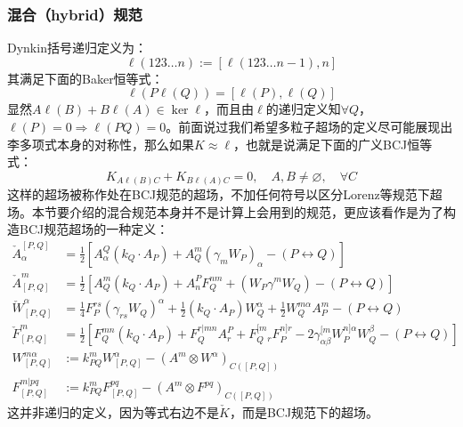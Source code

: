 \subsubsection{混合（hybrid）规范}
Dynkin括号递归定义为：
\begin{equation}
	\ell(123\ldots n):=[\ell(123\ldots n-1),n]
\end{equation}
其满足下面的Baker恒等式：
\begin{equation}
	\ell(P\ell(Q))=[\ell(P),\ell(Q)]
\end{equation}
显然$A\ell(B)+B\ell(A)\in\ker\ell$，而且由$\ell$的递归定义知$\forall Q$，$\ell(P) = 0\Rightarrow \ell(PQ)=0$。前面说过我们希望多粒子超场的定义尽可能展现出李多项式本身的对称性，那么如果$K\approx \ell$，也就是说满足下面的广义BCJ恒等式：
\begin{equation}
	K_{A\ell(B)C}+K_{B\ell(A)C}=0,\quad A,B\neq\varnothing,\quad\forall C
\end{equation}
这样的超场被称作处在BCJ规范的超场，不加任何符号以区分Lorenz等规范下超场。本节要介绍的混合规范本身并不是计算上会用到的规范，更应该看作是为了构造BCJ规范超场的一种定义：
\begin{equation}
	\begin{aligned}
		\check{A}_\alpha^{[P,  {Q}]}&=\frac{1}{2}[A_\alpha^  {Q}(k_Q\cdot A_P)+A_Q^m(\gamma_mW_P)_\alpha-(P\leftrightarrow Q)]
		\\\check{A}_{[P,  {Q}]}^m&=\frac{1}{2}[A_Q^m(k_Q\cdot A_P)+A_n^PF_Q^{nm}+(W_P\gamma^mW_Q)-(P\leftrightarrow Q)]\\
		\check{W}_{[P,  {Q}]}^\alpha&=\frac{1}{4}F_P^{rs}(\gamma_{rs}W_Q)^\alpha+\frac{1}{2}(k_Q\cdot A_P)W_Q^\alpha+\frac{1}{2}W_Q^{m\alpha}A_P^m-(P\leftrightarrow Q)\\
		\check{F}_{[P,  {Q}]}^m&=\frac{1}{2}{\left[F_Q^{mn}(k_Q\cdot A_P)+F_Q^{r|mn}A_r^P+F_Q^{[m}{}_rF_P^{n]r}-2\gamma_{\alpha\beta}^{[m}W_P^{n]\alpha}W_Q^\beta-(P\leftrightarrow Q)\right]}\\
		W_{[P,Q]}^{m\alpha}&:=k_{PQ}^mW_{[P,Q]}^\alpha-(A^m\otimes W^\alpha)_{C([P,Q])}\\
		F_{[P,Q]}^{m|pq}&:=k_{PQ}^mF_{[P,Q]}^{pq}-(A^m\otimes F^{pq})_{C([P,Q])}
	\end{aligned}
\end{equation}
这并非递归的定义，因为等式右边不是$\check K$，而是BCJ规范下的超场。
